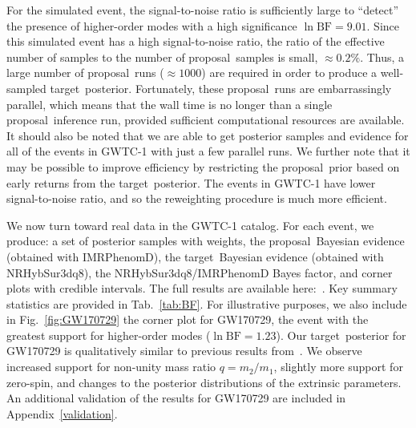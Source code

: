 \documentclass[prd,superscriptaddress,twocolumn,nopreprintnumbers,floatfix,longbibliography]{revtex4}
\newcommand{\sur}{{\sc NRHybSur3dq8}\xspace}
\newcommand{\proposal}{proposal}
\newcommand{\target}{target}
\begin{document}
For the simulated event, the signal-to-noise ratio is sufficiently large to ``detect'' the presence of higher-order modes with a high significance $\ln\text{BF}=9.01$.
Since this simulated event has a high signal-to-noise ratio, the ratio of the effective number of samples to the number of \proposal\ samples is small, $\approx0.2\%$.
Thus, a large number of \proposal\ runs ($\approx1000$) are required in order to produce a well-sampled \target\ posterior.
Fortunately, these \proposal\ runs are embarrassingly parallel, which means that the wall time is no longer than a single \proposal\ inference run, provided sufficient computational resources are available.
It should also be noted that we are able to get posterior samples and evidence for all of the events in GWTC-1 with just a few parallel runs.
We further note that it may be possible to improve efficiency by restricting the \proposal\ prior based on early returns from the \target\ posterior.
The events in GWTC-1 have lower signal-to-noise ratio, and so the reweighting procedure is much more efficient.

We now turn toward real data in the GWTC-1 catalog.
For each event, we produce: a set of posterior samples with weights, the \proposal\ Bayesian evidence (obtained with {\sc IMRPhenomD}), the \target\ Bayesian evidence (obtained with \sur), the \sur/{\sc IMRPhenomD} Bayes factor, and corner plots with credible intervals.
The full results are available here:~\cite{hom-git}.
Key summary statistics are provided in Tab.~\ref{tab:BF}.
For illustrative purposes, we also include in Fig.~\ref{fig:GW170729} the corner plot for GW170729, the event with the greatest support for higher-order modes ($\ln\text{BF}=1.23$).
Our \target\ posterior for GW170729 is qualitatively similar to previous results from~\cite{Chatziioannou}.
We observe increased support for non-unity mass ratio $q=m_2/m_1$, slightly more support for zero-spin, and changes to the posterior distributions of the extrinsic parameters.
An additional validation of the results for GW170729 are included in Appendix~\ref{validation}.
\end{document}
